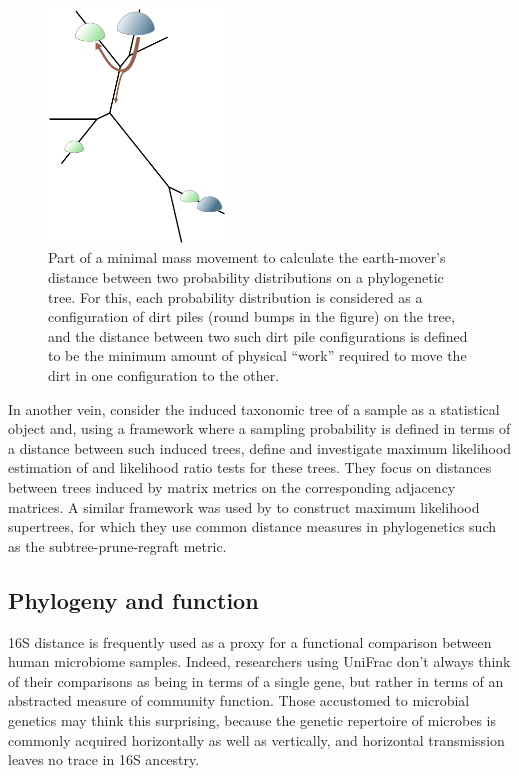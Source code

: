 \documentclass{amsart}
\newcommand{\forarxiv}[1]{#1}
\begin{document}
\newcommand{\dirtpilesLegend}{
    Part of a minimal mass movement to calculate the earth-mover's distance between two probability distributions on a phylogenetic tree.
    For this, each probability distribution is considered as a configuration of dirt piles (round bumps in the figure) on the tree, and the distance between two such dirt pile configurations is defined to be the minimum amount of physical ``work'' required to move the dirt in one configuration to the other.
}
\forarxiv{
\begin{figure}
  \vspace{-17pt}
  \begin{center}
    \includegraphics[width=1.85in]{figures/tree_dirtpiles.pdf}
  \end{center}
  \vspace{-5pt}
  \caption{\dirtpilesLegend}
  \label{fig:dirtpiles}
\end{figure}
}

In another vein, \citet{la2012statistical} consider the induced taxonomic tree of a sample as a statistical object and, using a framework where a sampling probability is defined in terms of a distance between such induced trees, define and investigate maximum likelihood estimation of and likelihood ratio tests for these trees.
They focus on distances between trees induced by matrix metrics on the corresponding adjacency matrices.
A similar framework was used by \citet{steel2008maximum} to construct maximum likelihood supertrees, for which they use common distance measures in phylogenetics such as the subtree-prune-regraft metric.


\subsection{Phylogeny and function}

16S distance is frequently used as a proxy for a functional comparison between human microbiome samples.
Indeed, researchers using UniFrac don't always think of their comparisons as being in terms of a single gene, but rather in terms of an abstracted measure of community function.
Those accustomed to microbial genetics may think this surprising, because the genetic repertoire of microbes is commonly acquired horizontally as well as vertically, and horizontal transmission leaves no trace in 16S ancestry.
\end{document}
